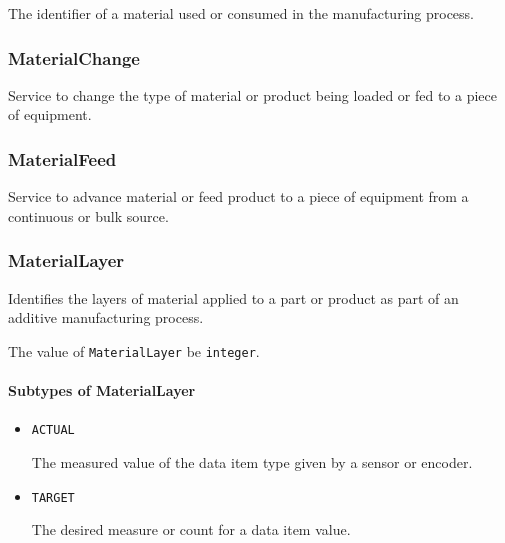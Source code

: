 The identifier of a material used or consumed in the manufacturing process.



\subsubsection{MaterialChange}
\label{sec:MaterialChange}



Service to change the type of material or product being loaded or fed to a piece of equipment.



\subsubsection{MaterialFeed}
\label{sec:MaterialFeed}



Service to advance material or feed product to a piece of equipment from a continuous or bulk source.



\subsubsection{MaterialLayer}
\label{sec:MaterialLayer}



Identifies the layers of material applied to a part or product as part of an additive manufacturing process.


The value of \texttt{MaterialLayer} \MUST be \texttt{integer}.


\paragraph{Subtypes of MaterialLayer}\mbox{}
\label{sec:Subtypes of MaterialLayer}

\begin{itemize}

\item \texttt{ACTUAL}


The measured value of the data item type given by a sensor or encoder.

\item \texttt{TARGET}


The desired measure or count for a data item value.


\end{itemize}





